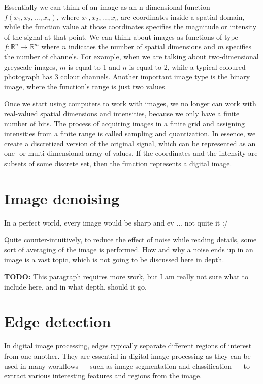 \documentclass[
  digital,     %
  oneside,     %
  nosansbold,  %
  nocolorbold, %
  lof,         %
  lot,         %
]{fithesis4}
\newcommand*{\R}{\ensuremath{\mathbb{R}}}
\begin{document}
Essentially we can think of an image as an n-dimensional function $f(x_1, x_2,
..., x_n)$, where $x_1, x_2, ..., x_n$ are coordinates inside a spatial domain,
while the function value at those coordinates specifies the magnitude or
intensity of the signal at that point. We can think about images as functions of
type $f:\R^n \rightarrow \R^m$ where $n$ indicates the number of spatial
dimensions and $m$ specifies the number of channels. For example, when we are
talking about two-dimensional greyscale images, $m$ is equal to 1 and $n$ is
equal to 2, while a typical coloured photograph has 3 colour channels. Another
important image type is the binary image, where the function's range is just two
values.

Once we start using computers to work with images, we no longer can work with
real-valued spatial dimensions and intensities, because we only have a finite
number of bits. The process of acquiring images in a finite grid and assigning
intensities from a finite range is called sampling and quantization. In essence,
we create a discretized version of the original signal, which can be represented
as an one- or multi-dimensional array of values. If the coordinates and the
intensity are subsets of some discrete set, then the function represents a
digital image.

\section{Image denoising}

In a perfect world, every image would be sharp and ev ... not quite it :/

Quite counter-intuitively, to reduce the effect of noise while reading details,
some sort of averaging of the image is performed. How and why a noise ends up in
an image is a vast topic, which is not going to be discussed here in depth.

\textbf{TODO:} This paragraph requires more work, but I am really not sure what
to include here, and in what depth, should it go.


\section{Edge detection}

In digital image processing, edges typically separate different regions of
interest from one another. They are essential in digital image processing
as they can be used in many workflows --- such as image segmentation and
classification --- to extract various interesting features and regions
from the image.
\end{document}
